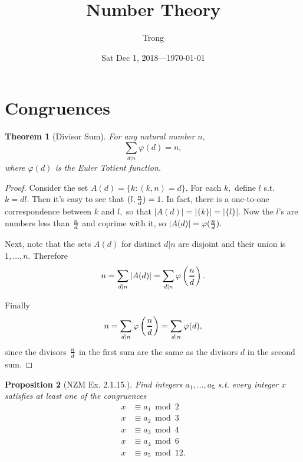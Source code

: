 \documentclass[20pt]{extarticle}
\title{Number Theory}
\author{Trong}
\date{Sat Dec 1, 2018---\today}
\theoremstyle{plain}
\newtheorem{theorem}{Theorem}
\newtheorem{proposition}[theorem]{Proposition}
\theoremstyle{definition}
\theoremstyle{remark}
\renewcommand\frac[2]{\genfrac{}{}{1pt}{}{#1}{#2}}
\newcommand{\0}{\varnothing}
\newcommand{\f}{\varphi}
\newcommand{\<}{\langle}
\renewcommand{\>}{\rangle}
\begin{document}
\sloppy
\maketitle
\thispagestyle{empty}
\pagestyle{empty}

\tableofcontents
\break

\section{Congruences}

\begin{theorem}[Divisor Sum]
  For any natural number $ n, $
\[
\sum _ { d | n } \f ( d ) = n,
\]
where \( \f(d) \) is the Euler Totient function.
\end{theorem}

\begin{proof}
Consider the set \( A(d) = \{ k: (k, n) = d \}. \) For each \( k, \) define \( l \) s.t. \( k = dl. \) Then it's easy to see that \( (l, \frac{n}{d}) = 1. \) In fact, there is a one-to-one correspondence between \( k \) and \( l, \) so that \( | A(d) | = | \{ k \} | = | \{ l \} |. \) Now the \( l \)'s are numbers less than \( \frac{n}{d} \) and coprime with it, so \( | A(d) | = \f(\frac{n}{d}). \)

Next, note that the sets \( A(d) \) for distinct \( d|n \) are disjoint and their union is \( {1, \ldots, n}. \) Therefore
\[
n = \sum_{d|n} |A(d)| = \sum_{d|n} \f\left(\frac{n}{d}\right).
\]

Finally
\[
n = \sum_{d|n} \f\left(\frac{n}{d}\right) = \sum_{d|n} \f(d),
\]
since the divisors \( \frac{n}{d} \) in the first sum are the same as the divisors \( d \) in the second sum.
\end{proof}

\begin{proposition}[NZM Ex. 2.1.15.]
Find integers $ a_1, \ldots, a_5 $ s.t. every integer $ x $ satisfies at least one of the congruences \begin{align*}
  x &\equiv a_1 \bmod 2 \\
  x &\equiv a_2 \bmod 3 \\
  x &\equiv a_3 \bmod 4 \\
  x &\equiv a_4 \bmod 6 \\
  x &\equiv a_5 \bmod 12. \tag{$ * $}
\end{align*}
\end{proposition}
\end{document}
